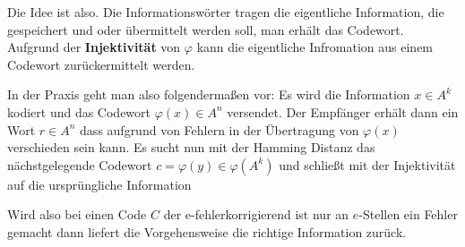 \documentclass{report}
\begin{document}
Die Idee ist also. Die Informationswörter tragen die eigentliche Information, die gespeichert und oder übermittelt werden soll, man erhält das Codewort. Aufgrund der \textbf{Injektivität} von $\varphi$ kann die eigentliche Infromation aus einem Codewort zurückermittelt werden.


In der Praxis geht man also folgendermaßen vor: Es wird die Information $x \in A^k$ kodiert und das Codewort $\varphi(x) \in A^n$ versendet. Der Empfänger erhält dann ein Wort $r \in A^n$ dass aufgrund von Fehlern in der Übertragung von $\varphi(x)$ verschieden sein kann. Es sucht nun mit der Hamming Distanz das nächstgelegende Codewort $c = \varphi(y) \in \varphi(A^k)$ und schließt mit der Injektivität auf die ursprüngliche Information


Wird also bei einen Code $C$ der e-fehlerkorrigierend ist nur an $e$-Stellen ein Fehler gemacht dann liefert die Vorgehensweise die richtige Information zurück.

\end{document}
